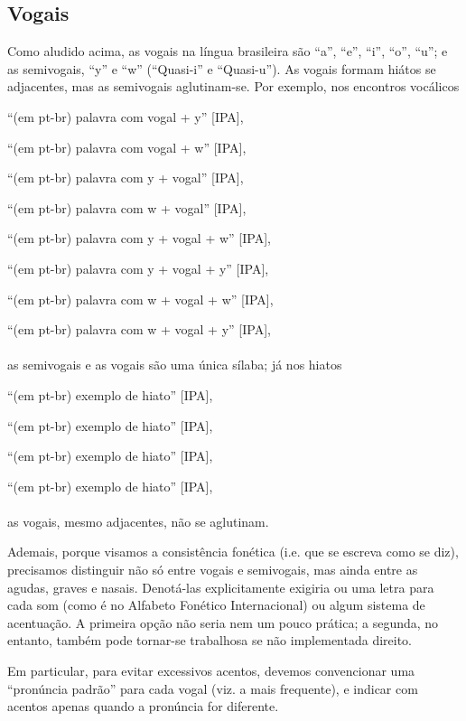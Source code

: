 \documentclass[12pt, a5paper, titlepage]{article}
\begin{document}
\begin{bilingualpages}
    \section{Vogais}
    Como aludido acima, as vogais na língua brasileira são ``a'', ``e'', ``i'',
    ``o'', ``u''; e as semivogais, ``y'' e ``w'' (``Quasi-i'' e ``Quasi-u''). As
    vogais formam hiátos se adjacentes, mas as semivogais aglutinam-se. Por exemplo, nos encontros vocálicos
    \\
    \par ``(em pt-br) palavra com vogal + y'' {[IPA]},
    \par ``(em pt-br) palavra com vogal + w'' {[IPA]},
    \par ``(em pt-br) palavra com y + vogal'' {[IPA]},
    \par ``(em pt-br) palavra com w + vogal'' {[IPA]},
    \par ``(em pt-br) palavra com y + vogal + w'' {[IPA]},
    \par ``(em pt-br) palavra com y + vogal + y'' {[IPA]},
    \par ``(em pt-br) palavra com w + vogal + w'' {[IPA]},
    \par ``(em pt-br) palavra com w + vogal + y'' {[IPA]},
    \\
    \\
    as semivogais e as vogais são uma única sílaba; já nos hiatos
    \\
    \par ``(em pt-br) exemplo de hiato'' [IPA],
    \par ``(em pt-br) exemplo de hiato'' [IPA],
    \par ``(em pt-br) exemplo de hiato'' [IPA],
    \par ``(em pt-br) exemplo de hiato'' [IPA],
    \\
    \\
    as vogais, mesmo adjacentes, não se aglutinam.

    Ademais, porque visamos a consistência fonética (i.e. que se escreva como se
    diz), precisamos distinguir não só entre vogais e semivogais, mas ainda entre
    as agudas, graves e nasais. Denotá-las explicitamente exigiria ou uma letra
    para cada som (como é no Alfabeto Fonético Internacional) ou algum sistema de
    acentuação. A primeira opção não seria nem um pouco prática; a segunda, no
    entanto, também pode tornar-se trabalhosa se não implementada direito.

    Em particular, para evitar excessivos acentos, devemos convencionar uma
    ``pronúncia padrão'' para cada vogal (viz. a mais frequente), e indicar com
    acentos apenas quando a pronúncia for diferente.


\end{bilingualpages}
\end{document}
